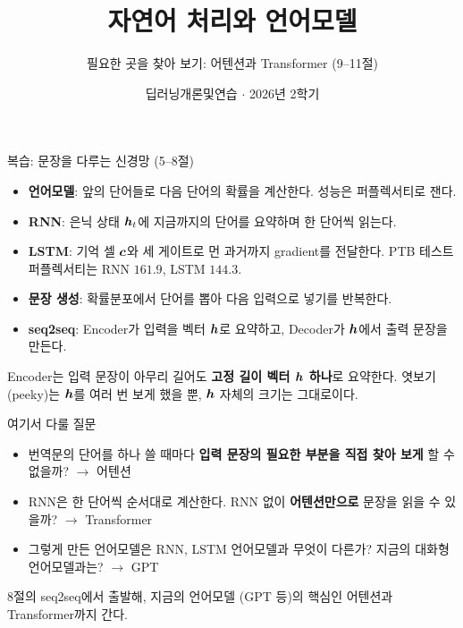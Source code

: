\documentclass[aspectratio=169,11pt]{beamer}
\title[자연어 처리와 언어모델]{자연어 처리와 언어모델}
\subtitle{필요한 곳을 찾아 보기: 어텐션과 Transformer (9--11절)}
\date{딥러닝개론및연습 $\cdot$ 2026년 2학기}
\begin{document}
\begin{frame}[plain]\titlepage\end{frame}

\begin{frame}{복습: 문장을 다루는 신경망 (5--8절)}
\begin{itemize}
\item \textbf{언어모델}: 앞의 단어들로 다음 단어의 확률을 계산한다.
  성능은 퍼플렉서티로 잰다.
\item \textbf{RNN}: 은닉 상태 $\bm{h}_t$에 지금까지의 단어를 요약하며 한 단어씩 읽는다.
\item \textbf{LSTM}: 기억 셀 $\bm{c}$와 세 게이트로 먼 과거까지 gradient를 전달한다.
  PTB 테스트 퍼플렉서티는 RNN $161.9$, LSTM $144.3$.
\item \textbf{문장 생성}: 확률분포에서 단어를 뽑아 다음 입력으로 넣기를 반복한다.
\item \textbf{seq2seq}: Encoder가 입력을 벡터 $\bm{h}$로 요약하고,
  Decoder가 $\bm{h}$에서 출력 문장을 만든다.
\end{itemize}
\vskip1mm
\begin{remarkbox}[남은 문제]
Encoder는 입력 문장이 아무리 길어도 \textbf{고정 길이 벡터 $\bm{h}$ 하나}로 요약한다.
엿보기 (peeky)는 $\bm{h}$를 여러 번 보게 했을 뿐, $\bm{h}$ 자체의 크기는 그대로이다.
\end{remarkbox}
\end{frame}

\begin{frame}{여기서 다룰 질문}
\begin{keybox}[여기서 다룰 질문]
\begin{itemize}
\item 번역문의 단어를 하나 쓸 때마다
  \textbf{입력 문장의 필요한 부분을 직접 찾아 보게} 할 수 없을까?
  \hfill $\to$ 어텐션
\item RNN은 한 단어씩 순서대로 계산한다.
  RNN 없이 \textbf{어텐션만으로} 문장을 읽을 수 있을까?
  \hfill $\to$ Transformer
\item 그렇게 만든 언어모델은 RNN, LSTM 언어모델과 무엇이 다른가?
  지금의 대화형 언어모델과는?
  \hfill $\to$ GPT
\end{itemize}
\end{keybox}
\vskip2mm
8절의 seq2seq에서 출발해, 지금의 언어모델 (GPT 등)의 핵심인 어텐션과 Transformer까지 간다.
\end{frame}
\end{document}
